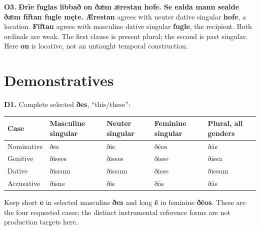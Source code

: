 \par\begin{minipage}{\linewidth}\raggedright
\textbf{O3.} \textbf{Ðrīe fuglas libbað on ðǣm ǣrestan hofe. Se ealda mann sealde ðǣm fīftan fugle męte.} \textbf{Ǣrestan} agrees with neuter dative singular \textbf{hofe}, a location. \textbf{Fīftan} agrees with masculine dative singular \textbf{fugle}, the recipient. Both ordinals are weak. The first clause is present plural; the second is past singular. Here \textbf{on} is locative, not an untaught temporal construction.

\end{minipage}\par\addvspace{4pt}

\section*{Demonstratives}

\par\begin{minipage}{\linewidth}\raggedright
\textbf{D1.} Complete selected \textbf{ðes}, “this/\allowbreak{}these”:

\par\begingroup
\fontsize{10.5}{13.2}\selectfont
\setlength{\LTleft}{0pt}\setlength{\LTright}{\fill}
\noindent
\begin{tabular}{@{}>{\raggedright\arraybackslash}p{19.22mm}>{\raggedright\arraybackslash}p{25.09mm}>{\raggedright\arraybackslash}p{21.44mm}>{\raggedright\arraybackslash}p{23.17mm}>{\raggedright\arraybackslash}p{23.84mm}@{}}
\toprule
\textbf{Case} & \textbf{Masculine singular} & \textbf{Neuter singular} & \textbf{Feminine singular} & \textbf{Plural, all genders} \\
\midrule
Nominative & ðes & ðis & ðēos & ðās \\
Genitive & ðisses & ðisses & ðisse & ðissa \\
Dative & ðissum & ðissum & ðisse & ðissum \\
Accusative & ðisne & ðis & ðās & ðās \\
\bottomrule
\end{tabular}
\par\endgroup

Keep short \textbf{e} in selected masculine \textbf{ðes} and long \textbf{ē} in feminine \textbf{ðēos}. These are the four requested cases; the distinct instrumental reference forms are not production targets here.

\end{minipage}\par\addvspace{4pt}

